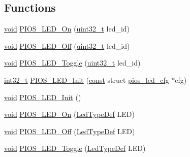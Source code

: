\subsection*{Functions}
\begin{DoxyCompactItemize}
\item 
\hyperlink{group___n_a_m_e_ga18028b8badbf1ea7e704ccac3c488e82}{void} \hyperlink{group___p_i_o_s___l_e_d_ga01bdbb3dbc510df35605228515952f41}{P\-I\-O\-S\-\_\-\-L\-E\-D\-\_\-\-On} (\hyperlink{stdint_8h_a435d1572bf3f880d55459d9805097f62}{uint32\-\_\-t} led\-\_\-id)
\item 
\hyperlink{group___n_a_m_e_ga18028b8badbf1ea7e704ccac3c488e82}{void} \hyperlink{group___p_i_o_s___l_e_d_gac35252f6ff6eee4d950345b66d62703c}{P\-I\-O\-S\-\_\-\-L\-E\-D\-\_\-\-Off} (\hyperlink{stdint_8h_a435d1572bf3f880d55459d9805097f62}{uint32\-\_\-t} led\-\_\-id)
\item 
\hyperlink{group___n_a_m_e_ga18028b8badbf1ea7e704ccac3c488e82}{void} \hyperlink{group___p_i_o_s___l_e_d_gabbfdd5bda4ecd72780fa1189f5d61840}{P\-I\-O\-S\-\_\-\-L\-E\-D\-\_\-\-Toggle} (\hyperlink{stdint_8h_a435d1572bf3f880d55459d9805097f62}{uint32\-\_\-t} led\-\_\-id)
\item 
\hyperlink{group___n_a_m_e_gafd12020da5a235dfcf0c3c748fb5baed}{int32\-\_\-t} \hyperlink{group___p_i_o_s___l_e_d_ga9ef731c878c1e48fa760add09e1f2720}{P\-I\-O\-S\-\_\-\-L\-E\-D\-\_\-\-Init} (\hyperlink{group___n_a_m_e_ga7ae6d0e43244213b34de2c2b9aa30da6}{const} struct \hyperlink{structpios__led__cfg}{pios\-\_\-led\-\_\-cfg} $\ast$cfg)
\item 
\hyperlink{group___n_a_m_e_ga18028b8badbf1ea7e704ccac3c488e82}{void} \hyperlink{group___p_i_o_s___l_e_d_gabefc8750c0f756d74b6ad70d3aae887b}{P\-I\-O\-S\-\_\-\-L\-E\-D\-\_\-\-Init} ()
\item 
\hyperlink{group___n_a_m_e_ga18028b8badbf1ea7e704ccac3c488e82}{void} \hyperlink{group___p_i_o_s___l_e_d_ga018c8e7d55d50682764d8c55d7cc77f8}{P\-I\-O\-S\-\_\-\-L\-E\-D\-\_\-\-On} (\hyperlink{win32_2inc_2pios__led_8h_aa9b117150c70d6a396fc4498b6474e3a}{Led\-Type\-Def} L\-E\-D)
\item 
\hyperlink{group___n_a_m_e_ga18028b8badbf1ea7e704ccac3c488e82}{void} \hyperlink{group___p_i_o_s___l_e_d_gac279283707be5f6d38b0f6ab91381c7c}{P\-I\-O\-S\-\_\-\-L\-E\-D\-\_\-\-Off} (\hyperlink{win32_2inc_2pios__led_8h_aa9b117150c70d6a396fc4498b6474e3a}{Led\-Type\-Def} L\-E\-D)
\item 
\hyperlink{group___n_a_m_e_ga18028b8badbf1ea7e704ccac3c488e82}{void} \hyperlink{group___p_i_o_s___l_e_d_ga47da390e2fc9352d89e8d80e83a3efbf}{P\-I\-O\-S\-\_\-\-L\-E\-D\-\_\-\-Toggle} (\hyperlink{win32_2inc_2pios__led_8h_aa9b117150c70d6a396fc4498b6474e3a}{Led\-Type\-Def} L\-E\-D)
\end{DoxyCompactItemize}


